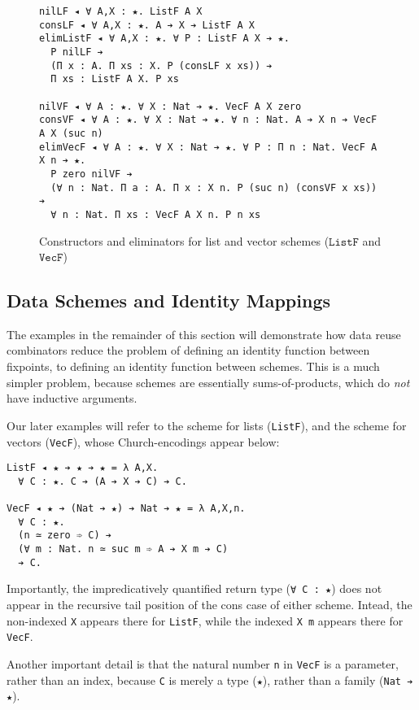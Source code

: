 \documentclass[acmsmall]{acmart}\settopmatter{}
\newcommand{\labsec}[1]{\label{sec:#1}}
\newcommand{\labfig}[1]{\label{fig:#1}}
\newcommand{\txt}[1]{\ensuremath{\texttt{#1}}}
\begin{document}
\begin{figure}
\centering

\begin{verbatim}
nilLF ◂ ∀ A,X : ★. ListF A X
consLF ◂ ∀ A,X : ★. A ➔ X ➔ ListF A X
elimListF ◂ ∀ A,X : ★. ∀ P : ListF A X ➔ ★.
  P nilLF ➔
  (Π x : A. Π xs : X. P (consLF x xs)) ➔
  Π xs : ListF A X. P xs

nilVF ◂ ∀ A : ★. ∀ X : Nat ➔ ★. VecF A X zero
consVF ◂ ∀ A : ★. ∀ X : Nat ➔ ★. ∀ n : Nat. A ➔ X n ➔ VecF A X (suc n)
elimVecF ◂ ∀ A : ★. ∀ X : Nat ➔ ★. ∀ P : Π n : Nat. VecF A X n ➔ ★.
  P zero nilVF ➔
  (∀ n : Nat. Π a : A. Π x : X n. P (suc n) (consVF x xs)) ➔ 
  ∀ n : Nat. Π xs : VecF A X n. P n xs
\end{verbatim}

\caption{Constructors and eliminators for list and vector schemes (\txt{ListF} and \txt{VecF})}
\labfig{schemes}
\end{figure}

\subsection{Data Schemes and Identity Mappings}
\labsec{data:schemes}

The examples in the remainder of this section will demonstrate how
data reuse combinators reduce the problem of defining an identity
function between fixpoints, to defining an identity function between
schemes. This is a much simpler problem, because schemes are
essentially sums-of-products, which do \textit{not} have inductive
arguments.

Our later examples will refer to the scheme for lists (\verb;ListF;),
and the scheme for vectors (\verb;VecF;), whose Church-encodings
appear below:

\begin{verbatim}
ListF ◂ ★ ➔ ★ ➔ ★ = λ A,X. 
  ∀ C : ★. C ➔ (A ➔ X ➔ C) ➔ C.

VecF ◂ ★ ➔ (Nat ➔ ★) ➔ Nat ➔ ★ = λ A,X,n.
  ∀ C : ★.
  (n ≃ zero ➾ C) ➔
  (∀ m : Nat. n ≃ suc m ➾ A ➔ X m ➔ C)
  ➔ C.
\end{verbatim}
Importantly, the impredicatively quantified return type
(\verb;∀ C : ★;) does not appear in the recursive
tail position of the cons case of either scheme. Intead, the
non-indexed \verb;X; appears there for \verb;ListF;, while the indexed
\verb;X m; appears there for \verb;VecF;.

Another important detail is that the natural number \verb;n; in
\verb;VecF; is a parameter, rather than an index, because \verb;C; is
merely a type (\verb;★;), rather than a family (\verb;Nat ➔ ★;).
\end{document}
